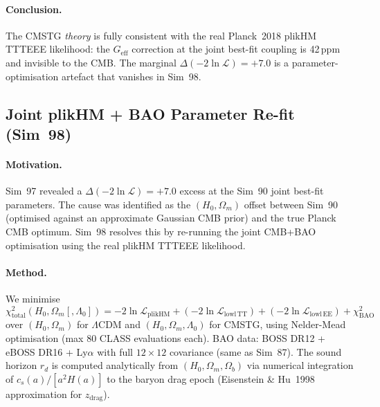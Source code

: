 \documentclass[12pt,a4paper]{article}
\begin{document}
\paragraph{Conclusion.}
The CMSTG \emph{theory} is fully consistent with the real Planck~2018 plikHM TTTEEE
likelihood: the $G_\mathrm{eff}$ correction at the joint best-fit coupling is
42\,ppm and invisible to the CMB.  The marginal $\Delta(-2\ln\mathcal{L})=+7.0$
is a parameter-optimisation artefact that vanishes in Sim~98.

\subsection{Joint plikHM + BAO Parameter Re-fit (Sim~98)}
\label{sec:obs_sim98}

\paragraph{Motivation.}  Sim~97 revealed a $\Delta(-2\ln\mathcal{L})=+7.0$ excess
at the Sim~90 joint best-fit parameters.  The cause was identified as the
$(H_0,\Omega_m)$ offset between Sim~90 (optimised against an approximate Gaussian
CMB prior) and the true Planck CMB optimum.  Sim~98 resolves this by re-running
the joint CMB+BAO optimisation using the real plikHM TTTEEE likelihood.

\paragraph{Method.}  We minimise
\begin{equation}
  \chi^2_\mathrm{total}(H_0, \Omega_m [, \Lambda_0])
  = -2\ln\mathcal{L}_\mathrm{plikHM} + (-2\ln\mathcal{L}_\mathrm{lowl\,TT})
    + (-2\ln\mathcal{L}_\mathrm{lowl\,EE}) + \chi^2_\mathrm{BAO}
\end{equation}
over $(H_0, \Omega_m)$ for $\Lambda$CDM and $(H_0, \Omega_m, \Lambda_0)$ for CMSTG,
using Nelder-Mead optimisation (max 80 CLASS evaluations each).
BAO data: BOSS DR12 + eBOSS DR16 + Ly$\alpha$ with full $12\times12$ covariance
(same as Sim~87). The sound horizon $r_d$ is computed analytically from $(H_0, \Omega_m,
\Omega_b)$ via numerical integration of $c_s(a)/[a^2 H(a)]$ to the baryon drag epoch
(Eisenstein \& Hu~1998 approximation for $z_\mathrm{drag}$).
\end{document}
